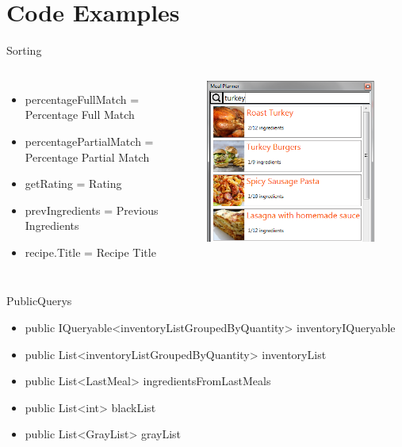 \section{Code Examples}

\begin{frame}{Sorting}
    \begin{columns}
        \begin{itemize}
            \item percentageFullMatch = Percentage Full Match
            \item percentagePartialMatch = Percentage Partial Match
            \item getRating = Rating
            \item prevIngredients = Previous Ingredients
            \item recipe.Title = Recipe Title
        \end{itemize}
        \begin{figure}
            \centering
            \includegraphics[width=\textwidth]{graphics/recipe-search-item}
        \end{figure}
    \end{columns}

\end{frame}

\begin{frame}{PublicQuerys}
    \begin{itemize}
        \item public IQueryable<inventoryListGroupedByQuantity> inventoryIQueryable
        \item public List<inventoryListGroupedByQuantity> inventoryList
        \item public List<LastMeal> ingredientsFromLastMeals
        \item public List<int> blackList
        \item public List<GrayList> grayList
    \end{itemize}
\end{frame}

